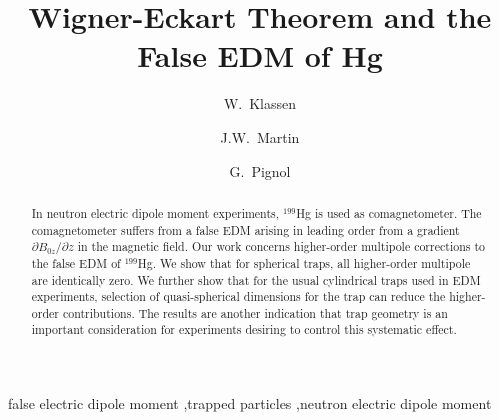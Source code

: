 \documentclass[preprint,12pt]{elsarticle}
\begin{document}
\begin{frontmatter}


\title{Wigner-Eckart Theorem and the False EDM of Hg}




\author[um]{W.~Klassen}
\author[uw,um]{J.W.~Martin}
\author[lspc]{G.~Pignol}

\address[um]{Physics and Astronomy, University of Manitoba, Winnipeg, MB, Canada}
\address[uw]{Department of Physics, The University of Winnipeg, Winnipeg, MB, Canada}
\address[lspc]{Universit\'e Grenoble Alpes, CNRS, Grenoble INP, LPSC-IN2P3, Grenoble, France}

\begin{abstract}
  In neutron electric dipole moment experiments, $^{199}$Hg is used as
  comagnetometer.  The comagnetometer suffers from a false EDM arising
  in leading order from a gradient $\partial B_{0z}/\partial z$ in the
  magnetic field.  Our work concerns higher-order multipole
  corrections to the false EDM of $^{199}$Hg.  We show that for
  spherical traps, all higher-order multipole are identically zero.
  We further show that for the usual cylindrical traps used in EDM
  experiments, selection of quasi-spherical dimensions for the trap
  can reduce the higher-order contributions.  The results are another
  indication that trap geometry is an important consideration for
  experiments desiring to control this systematic effect.
\end{abstract}

\begin{keyword}
false electric dipole moment \sep trapped particles \sep neutron electric dipole moment


\end{keyword}

\end{frontmatter}
\end{document}
